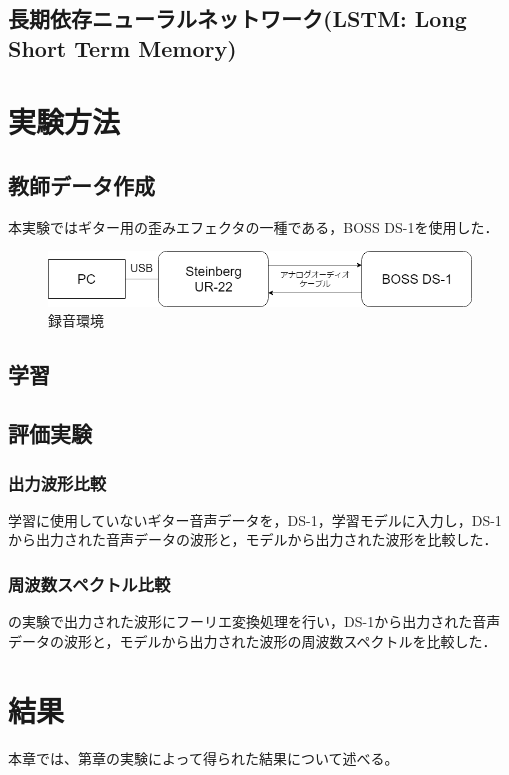 \documentclass{jreport}		%
\begin{document}
\section{長期依存ニューラルネットワーク(LSTM: Long Short Term Memory)}

\chapter{実験方法}
\section{教師データ作成}
本実験ではギター用の歪みエフェクタの一種である，BOSS DS-1を使用した．
\begin{figure}[htbp]
 \begin{center}
  \includegraphics[width=120mm]{env.png}
 \end{center}
 \caption{録音環境}
 \label{fig:one}
\end{figure}

\section{学習}

\section{評価実験}
\subsection{出力波形比較}
学習に使用していないギター音声データを，DS-1，学習モデルに入力し，DS-1から出力された音声データの波形と，モデルから出力された波形を比較した．

\subsection{周波数スペクトル比較}
の実験で出力された波形にフーリエ変換処理を行い，DS-1から出力された音声データの波形と，モデルから出力された波形の周波数スペクトルを比較した．

\chapter{結果}
本章では、第章の実験によって得られた結果について述べる。
\end{document}
